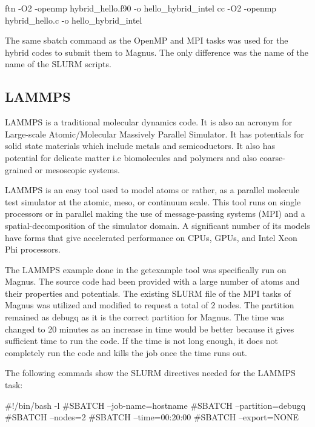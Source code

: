 \documentclass[journal]{IEEEtran}
\begin{document}
ftn -O2 -openmp hybrid_hello.f90 -o hello_hybrid_intel
cc -O2 -openmp hybrid_hello.c -o hello_hybrid_intel

The same sbatch command as the OpenMP and MPI tasks was used for the hybrid codes to submit them to Magnus. The only difference was the name of the name
of the SLURM scripts.


\subsection{LAMMPS}

LAMMPS is a traditional molecular dynamics code. It is also an acronym for Large-scale Atomic/Molecular Massively Parallel Simulator. It has potentials
for solid state materials which include metals and semicoductors. It also has potential for delicate matter i.e biomolecules and polymers and also
coarse-grained or mesoscopic systems.

LAMMPS is an easy tool used to model atoms or rather, as a parallel molecule test simulator at the atomic, meso, or continuum scale. This tool runs on
single processors or in parallel making the use of message-passing systems (MPI) and a spatial-decomposition of the simulator domain. A significant
number of its models have forms that give accelerated performance on CPUs, GPUs, and Intel Xeon Phi processors.

The LAMMPS example done in the getexample tool was specifically run on Magnus. The source code had been provided with a large number of atoms and their
properties and potentials. The existing SLURM file of the MPI tasks of Magnus was utilized and modified to request a total of 2 nodes. The partition
remained as debugq as it is the correct partition for Magnus. The time was changed to 20 minutes as an increase in time would be better because it gives
sufficient time to run the code. If the time is not long enough, it does not completely run the code and kills the job once the time runs out.

The following commads show the SLURM directives needed for the LAMMPS task:




#!/bin/bash -l
#SBATCH --job-name=hostname
#SBATCH --partition=debugq
#SBATCH --nodes=2
#SBATCH --time=00:20:00
#SBATCH --export=NONE
\end{document}
